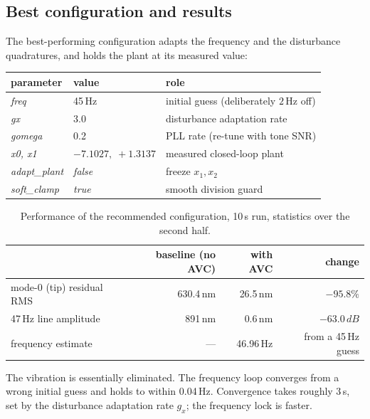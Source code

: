\documentclass[11pt]{article}
\newcommand{\SI}[2]{#1\,#2}
\begin{document}
\subsection{Best configuration and results}
\label{sec:best}

The best-performing configuration adapts the frequency and the disturbance quadratures, and holds the plant at its measured value:

\begin{center}\small
\begin{tabular}{lll}
\toprule
parameter & value & role\\
\midrule
\textit{freq}         & \SI{45}{Hz} & initial guess (deliberately $2$\,Hz off)\\
\textit{gx}           & 3.0         & disturbance adaptation rate\\
\textit{gomega}       & 0.2         & PLL rate (re-tune with tone SNR)\\
\textit{x0, x1}       & $-7.1027,\;+1.3137$ & measured closed-loop plant\\
\textit{adapt\_plant} & \textit{false} & freeze $x_1,x_2$\\
\textit{soft\_clamp}  & \textit{true}  & smooth division guard\\
\bottomrule
\end{tabular}
\end{center}

\begin{table}
\centering
\begin{tabular}{lrrr}
\toprule
 & baseline (no AVC) & with AVC & change\\
\midrule
mode-0 (tip) residual RMS      & \SI{630.4}{nm} & \SI{26.5}{nm} & $-95.8\%$\\
\SI{47}{Hz} line amplitude     & \SI{891}{nm}   & \SI{0.6}{nm}  & $-\SI{63.0}{dB}$\\
frequency estimate             & ---            & \SI{46.96}{Hz} & from a \SI{45}{Hz} guess\\
\bottomrule
\end{tabular}
\caption{Performance of the recommended configuration, \SI{10}{s} run, statistics over the second half.}
\label{tab:best}
\end{table}

The vibration is essentially eliminated.
%
The frequency loop converges from a wrong initial guess and holds to within \SI{0.04}{Hz}.
%
Convergence takes roughly \SI{3}{s}, set by the disturbance adaptation rate $g_x$; the frequency lock is faster.
\end{document}
